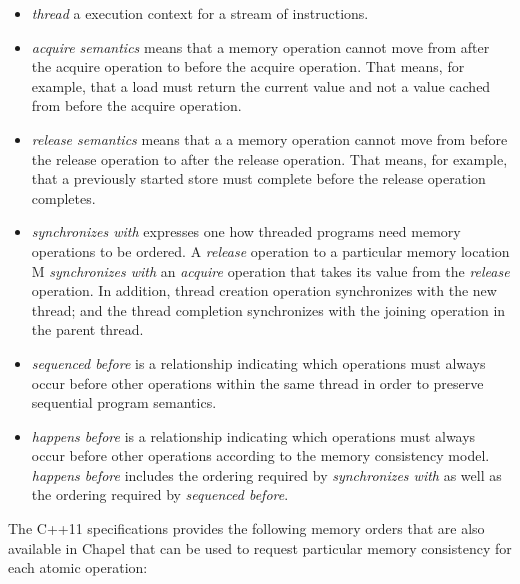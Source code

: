\begin{itemize}

  \item \textit{thread} a execution context for a stream of instructions.

  \item \textit{acquire semantics} means that a memory operation cannot move
  from after the acquire operation to before the acquire operation. That means,
  for example, that a load must return the current value and not a value cached
  from before the acquire operation.

  \item \textit{release semantics} means that a a memory operation cannot move
  from before the release operation to after the release operation. That means,
  for example, that a previously started store must complete before the release
  operation completes.

  \item \textit{synchronizes with} expresses one how threaded programs need
  memory operations to be ordered. A \textit{release} operation to a particular
  memory location M \textit{synchronizes with} an \textit{acquire} operation
  that takes its value from the \textit{release} operation. In addition, thread
  creation operation synchronizes with the new thread; and the thread
  completion synchronizes with the joining operation in the parent thread.

  \item \textit{sequenced before} is a relationship indicating which operations
  must always occur before other operations within the same thread in order to
  preserve sequential program semantics.

  \item \textit{happens before} is a relationship indicating which operations
  must always occur before other operations according to the memory consistency
  model. \textit{happens before} includes the ordering required by
  \textit{synchronizes with} as well as the ordering required by
  \textit{sequenced before}.

\end{itemize}
 
The C++11 specifications provides the following memory orders that are also
available in Chapel that can be used to request particular memory consistency
for each atomic operation:


